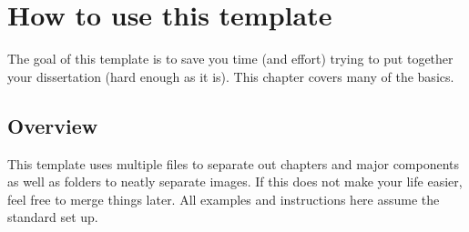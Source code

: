 \chapter{How to use this template}
The goal of this template is to save you time (and effort) trying to put together your dissertation (hard enough as it is). This chapter covers many of the basics. 

\section{Overview}
This template uses multiple files to separate out chapters and major components as well as folders to neatly separate images. If this does not make your life easier, feel free to merge things later. All examples and instructions here assume the standard set up.

